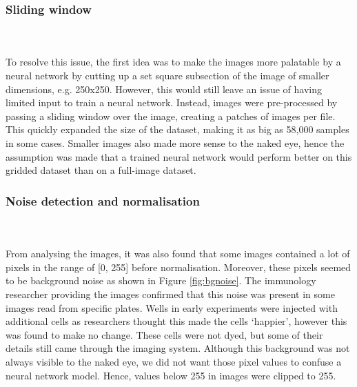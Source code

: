 \bigskip
\subsubsection{Sliding window}    

\hfill\\
\hfill\\
To resolve this issue, the first idea was to make the images more palatable by a neural network by cutting up a set square subsection of the image of smaller dimensions, e.g. 250x250. However, this would still leave an issue of having limited input to train a neural network. Instead, images were pre-processed by passing a sliding window over the image, creating a patches of images per file. This quickly expanded the size of the dataset, making it as big as 58,000 samples in some cases. Smaller images also made more sense to the naked eye, hence the assumption was made that a trained neural network would perform better on this gridded dataset than on a full-image dataset. 

\bigskip
\subsubsection{Noise detection and normalisation}

\hfill\\
\hfill\\
From analysing the images, it was also found that some images contained a lot of pixels in the range of [0, 255] before normalisation. Moreover, these pixels seemed to be background noise as shown in Figure \ref{fig:bgnoise}. The immunology researcher providing the images confirmed that this noise was present in some images read from specific plates. Wells in early experiments were injected with additional cells as researchers thought this made the cells `happier', however this was found to make no change. These cells were not dyed, but some of their details still came through the imaging system. Although this background was not always visible to the naked eye, we did not want those pixel values to confuse a neural network model. Hence, values below 255 in images were clipped to 255.

